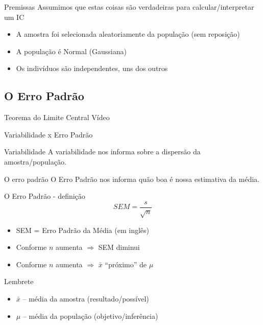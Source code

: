 \documentclass{beamer}
\begin{document}
\begin{frame}{\scriptsize Premissas}
  Assumimos que estas coisas são verdadeiras para calcular/interpretar um IC
  \begin{itemize}
    \footnotesize
  \item A amostra foi selecionada aleatoriamente da população (sem reposição)
  \item A população é Normal (Gaussiana)
  \item Os indivíduos são independentes, uns dos outros
  \end{itemize}
\end{frame}

\subsection{O Erro Padrão}

\begin{frame}{\scriptsize Teorema do Limite Central}
  Vídeo
\end{frame}

\begin{frame}{\scriptsize Variabilidade x Erro Padrão}
  \begin{block}{Variabilidade}
    \footnotesize
    A variabilidade nos informa sobre a dispersão da amostra/população.
  \end{block}
  \begin{block}{O erro padrão}
    \footnotesize
    O Erro Padrão nos informa quão boa é nossa \alert{estimativa} da média.
  \end{block}
\end{frame}

\begin{frame}{\scriptsize O Erro Padrão - definição}
  \begin{displaymath}
    SEM = \frac{s}{\sqrt{n}}
  \end{displaymath}
  \begin{itemize}
    \footnotesize
  \item SEM = Erro Padrão da Média ({\tiny em inglês})
  \item Conforme $n$ aumenta $\Rightarrow$ SEM diminui
  \item Conforme $n$ aumenta $\Rightarrow$ $\bar{x}$ ``próximo'' de $\mu$
  \end{itemize}
  \begin{block}{Lembrete}
    \footnotesize
    \begin{itemize}
    \footnotesize
    \item $\bar{x}$ -- média da amostra (resultado/possível)
    \item $\mu$ -- média da população (objetivo/inferência)
    \end{itemize}
  \end{block}
\end{frame}
\end{document}
